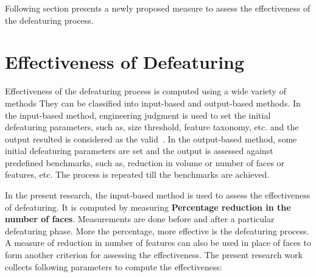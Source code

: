 Following section presents a newly proposed measure to assess the effectiveness of the defeaturing process.

\section{Effectiveness of Defeaturing}\label{sec:defeaturing:effectiveness}


Effectiveness of the defeaturing process is computed using a wide variety of methods They can be classified into input-based and output-based methods. In the input-based method, engineering judgment is used to set the initial defeaturing parameters, such as, size threshold, feature taxonomy, etc. and the output resulted is considered as the valid~\cite{MobleyCarrollCanann1998}. In the output-based method, some initial defeaturing parameters are set and the output is assessed against predefined benchmarks, such as, reduction in volume or number of faces or features, etc. The process is repeated till the benchmarks are  achieved. 

In the present research, the input-based method is used to assess the effectiveness of defeaturing. It is computed by measuring {\bf Percentage reduction in the number of faces}. Measurements are done before and after a particular defeaturing phase. More the percentage, more effective is the defeaturing process. A measure of reduction in number of features can also be used in place of faces to form another criterion for assessing the effectiveness. The present research work collects following parameters to compute the effectiveness:



